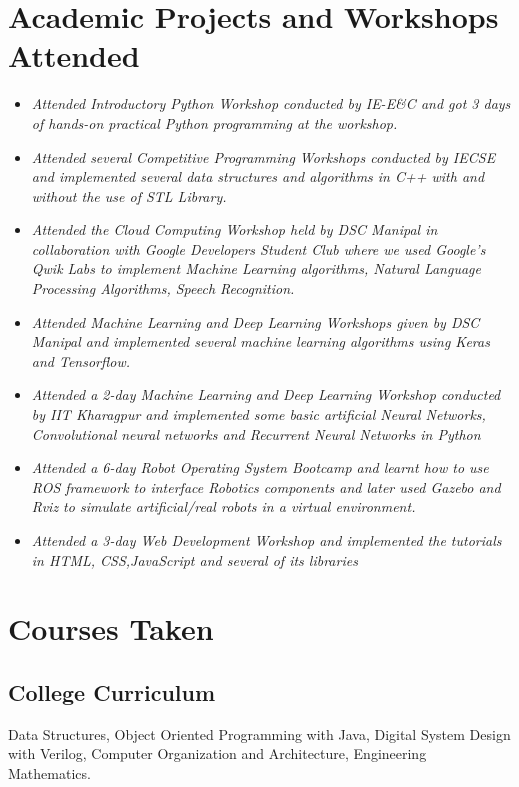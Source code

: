 \documentclass[a4paper,12pt]{article}
\begin{document}
\section*{Academic Projects and Workshops Attended}
\begin{itemize}
    \item{\textit{Attended Introductory Python Workshop conducted by IE-E\&C
    and got 3 days of hands-on practical Python programming at
    the workshop.}}
    \item{\textit{Attended several Competitive Programming Workshops
    conducted by IECSE and implemented several data structures
    and algorithms in C++ with and without the use of STL Library.}}
    \item{\textit{Attended the Cloud Computing Workshop held by DSC
    Manipal in collaboration with Google Developers Student Club
    where we used Google’s Qwik Labs to implement Machine
    Learning algorithms, Natural Language Processing Algorithms,
    Speech Recognition.}}
    \item{\textit{Attended Machine Learning and Deep Learning Workshops
    given by DSC Manipal and implemented several machine
    learning algorithms using Keras and Tensorflow. }}
    \item{\textit{Attended a 2-day Machine Learning and Deep Learning Workshop 
    conducted by IIT Kharagpur and implemented some basic artificial Neural Networks,
    Convolutional neural networks and Recurrent Neural Networks in Python }}
    \item{\textit{Attended a 6-day Robot Operating System Bootcamp and
    learnt how to use ROS framework to interface Robotics
    components and later used Gazebo and Rviz to simulate
    artificial/real robots in a virtual environment.}}
    \item{\textit{Attended a 3-day Web Development Workshop and implemented 
    the tutorials in HTML, CSS,JavaScript and several of its libraries}}
\end{itemize}

\section*{Courses Taken}
    \subsection*{College Curriculum}
    Data Structures,
    Object Oriented Programming with Java,
    Digital System Design with Verilog,
    Computer Organization and Architecture,
    Engineering Mathematics. 
\end{document}
